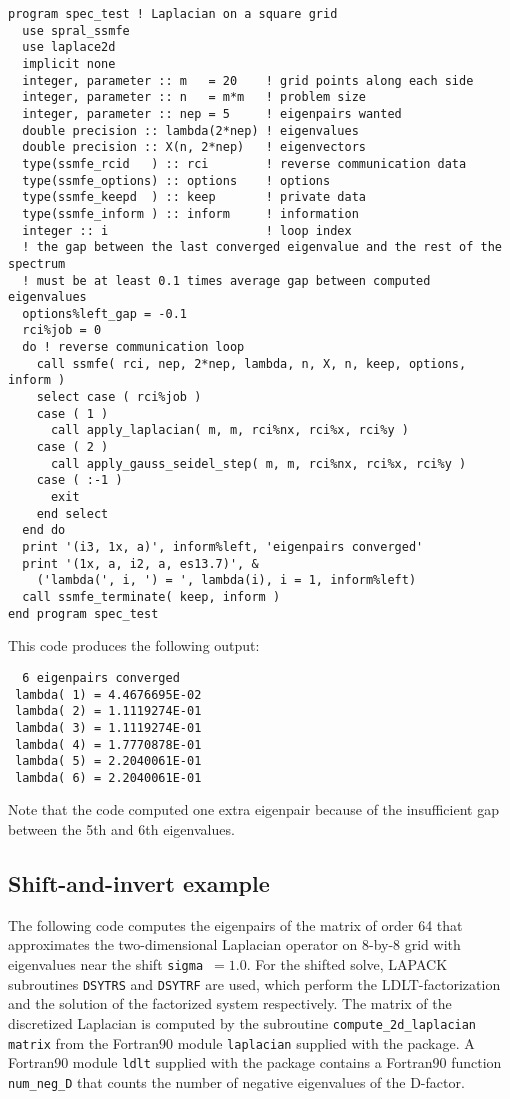 \begin{verbatim}
program spec_test ! Laplacian on a square grid
  use spral_ssmfe
  use laplace2d
  implicit none
  integer, parameter :: m   = 20    ! grid points along each side
  integer, parameter :: n   = m*m   ! problem size
  integer, parameter :: nep = 5     ! eigenpairs wanted
  double precision :: lambda(2*nep) ! eigenvalues
  double precision :: X(n, 2*nep)   ! eigenvectors
  type(ssmfe_rcid   ) :: rci        ! reverse communication data
  type(ssmfe_options) :: options    ! options
  type(ssmfe_keepd  ) :: keep       ! private data
  type(ssmfe_inform ) :: inform     ! information
  integer :: i                      ! loop index
  ! the gap between the last converged eigenvalue and the rest of the spectrum
  ! must be at least 0.1 times average gap between computed eigenvalues
  options%left_gap = -0.1
  rci%job = 0
  do ! reverse communication loop
    call ssmfe( rci, nep, 2*nep, lambda, n, X, n, keep, options, inform )
    select case ( rci%job )
    case ( 1 )
      call apply_laplacian( m, m, rci%nx, rci%x, rci%y )
    case ( 2 )
      call apply_gauss_seidel_step( m, m, rci%nx, rci%x, rci%y )
    case ( :-1 )
      exit
    end select
  end do
  print '(i3, 1x, a)', inform%left, 'eigenpairs converged'
  print '(1x, a, i2, a, es13.7)', &
    ('lambda(', i, ') = ', lambda(i), i = 1, inform%left)
  call ssmfe_terminate( keep, inform )
end program spec_test
\end{verbatim}

This code produces the following output:

\begin{verbatim}
  6 eigenpairs converged
 lambda( 1) = 4.4676695E-02
 lambda( 2) = 1.1119274E-01
 lambda( 3) = 1.1119274E-01
 lambda( 4) = 1.7770878E-01
 lambda( 5) = 2.2040061E-01
 lambda( 6) = 2.2040061E-01
\end{verbatim}

Note that the code computed one extra eigenpair
because of the insufficient gap between the 5th and 6th
eigenvalues.

\subsection{Shift-and-invert example}
\label{sec:ex.si}

The following code 
computes the eigenpairs of 
the matrix of order 64 that approximates 
the two-dimensional Laplacian operator
on 8-by-8 grid
with eigenvalues near the shift {\tt sigma $=1.0$}.
For the shifted solve, LAPACK subroutines {\tt DSYTRS} and
{\tt DSYTRF} are used,
which perform the LDLT-factorization and
the solution of the factorized system respectively.
The matrix of the discretized Laplacian is computed
by the subroutine {\tt compute\_2d\_laplacian matrix}
from the Fortran90 module {\tt laplacian}
supplied with the package.
A Fortran90 module {\tt ldlt} supplied with the package
contains a Fortran90 function {\tt num\_neg\_D}
that counts the number of negative eigenvalues of
the D-factor.

